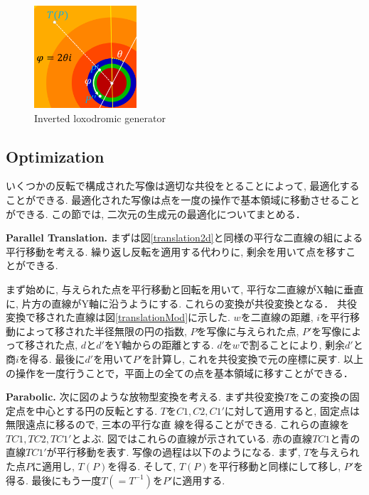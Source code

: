 \begin{figure}[h!tbp]
  \hspace*{\fill}
 \begin{minipage}[t]{0.24\hsize}
   \begin{center}
    \includegraphics[width=1.5in, height=1.5in, keepaspectratio]{../img/klein/2diis/loxodromicModRotation.pdf}
   \end{center}
   \caption{Inverted loxodromic generator}
   \label{fig:loxodromicRotationMod}
  \hspace*{\fill}
 \end{minipage}
\end{figure}

\subsection{Optimization}

いくつかの反転で構成された写像は適切な共役をとることによって, 最適化する
ことができる.
最適化された写像は点を一度の操作で基本領域に移動させることができる.
この節では, 二次元の生成元の最適化についてまとめる．

\noindent\textbf{Parallel Translation.}
まずは図\ref{translation2d}と同様の平行な二直線の組による平行移動を考える.
繰り返し反転を適用する代わりに, 剰余を用いて点を移すことができる.

まず始めに, 与えられた点を平行移動と回転を用いて,
平行な二直線がX軸に垂直に, 片方の直線がY軸に沿うようにする.
これらの変換が共役変換となる．
共役変換で移された直線は図\ref{translationMod}に示した.
$w$を二直線の距離, $i$を平行移動によって移された半径無限の円の指数,
$P$を写像に与えられた点,
$P'$を写像によって移された点, $d$と$d'$をY軸からの距離とする.
$d$を$w$で割ることにより, 剰余$d'$と商$i$を得る.
最後に$d'$を用いて$P'$を計算し, これを共役変換で元の座標に戻す.
以上の操作を一度行うことで，平面上の全ての点を基本領域に移すことができる．

\noindent\textbf{Parabolic.}
次に図のような放物型変換を考える.
まず共役変換$T$をこの変換の固定点を中心とする円の反転とする.
$T$を$C1,C2,C1'$に対して適用すると, 固定点は無限遠点に移るので, 三本の平行な直
線を得ることができる.
これらの直線を$TC1, TC2, TC1'$とよぶ.
図ではこれらの直線が示されている.
赤の直線$TC1$と青の直線$TC1'$が平行移動を表す.
写像の過程は以下のようになる.
まず, $T$を与えられた点$P$に適用し, $T(P)$を得る.
そして, $T(P)$を平行移動と同様にして移し, $P'$を得る.
最後にもう一度$T(= T^{-1})$を$P'$に適用する.

